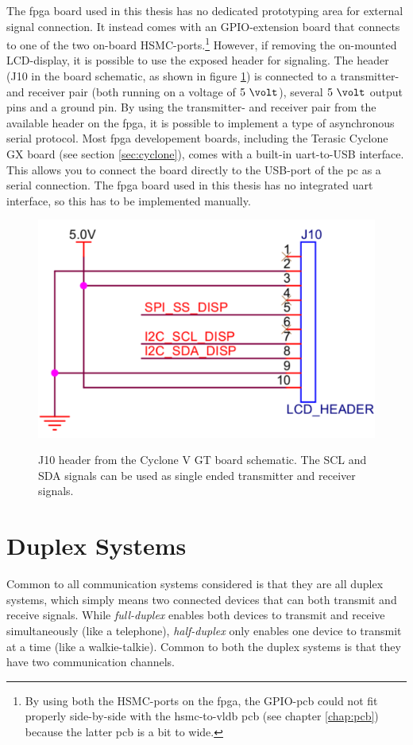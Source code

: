 \documentclass[main.tex]{subfiles}
\begin{document}
The \gls{fpga} board used in this thesis has no dedicated prototyping area for external signal connection. It instead comes with an GPIO-extension board that connects to one of the two on-board HSMC-ports.\footnote{By using both the HSMC-ports on the \gls{fpga}, the GPIO-\gls{pcb} could not fit properly side-by-side with the \acrshort{hsmc}-to-\acrshort{vldb} \acrshort{pcb} (see chapter \ref{chap:pcb}) because the latter \gls{pcb} is a bit to wide.} However, if removing the on-mounted LCD-display, it is possible to use the exposed header for signaling. The header (J10 in the board schematic, as shown in figure \ref{fig:lcdheader}) is connected to a transmitter- and receiver pair (both running on a voltage of $5~\volt$), several $5~\volt$ output pins and a ground pin. By using the transmitter- and receiver pair from the available header on the \gls{fpga}, it is possible to implement a type of asynchronous serial protocol. Most \gls{fpga} developement boards, including the Terasic Cyclone GX board (see section \ref{sec:cyclone}), comes with a built-in \gls{uart}-to-USB interface. This allows you to connect the board directly to the USB-port of the \acrshort{pc} as a serial connection. The \gls{fpga} board used in this thesis has no integrated \gls{uart} interface, so this has to be implemented manually.

\begin{figure}[] %
\includegraphics[width=0.5\linewidth]{../img/lcdheader.pdf}  \\[0.1 cm]
\caption{J10 header from the Cyclone V GT board schematic. The SCL and SDA signals can be used as single ended transmitter and receiver signals.}
\label{fig:lcdheader}
\end{figure}

\section{Duplex Systems}

Common to all communication systems considered is that they are all duplex systems, which simply means two connected devices that can both transmit and receive signals. While \textit{full-duplex} enables both devices to transmit and receive simultaneously (like a telephone), \textit{half-duplex} only enables one device to transmit at a time (like a walkie-talkie). Common to both the duplex systems is that they have two communication channels. 
\end{document}
